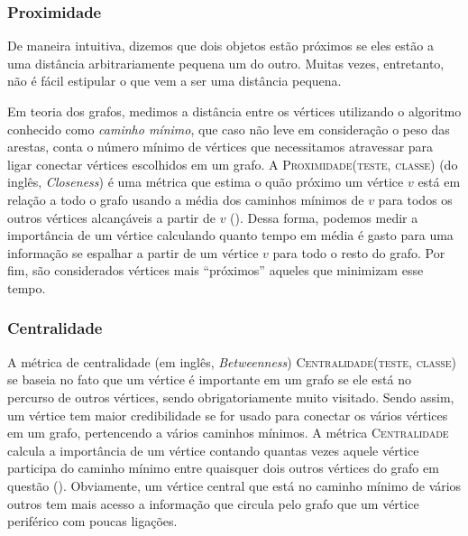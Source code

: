 \subsubsection{Proximidade}
\label{subsubsection::closeness}

De maneira intuitiva, dizemos que dois objetos estão próximos se eles estão a uma distância arbitrariamente pequena um do outro. Muitas vezes, entretanto, não é fácil estipular o que vem a ser uma distância pequena. 

Em teoria dos grafos, medimos a distância entre os vértices utilizando o algoritmo conhecido como \textit{caminho mínimo}, que caso não leve em consideração o peso das arestas, conta o número mínimo de vértices que necessitamos atravessar para ligar conectar vértices escolhidos em um grafo. A \textsc{Proximidade(teste, classe)} (do inglês, \textit{Closeness}) é uma métrica que estima o quão próximo um vértice $v$ está em relação a todo o grafo usando a média dos caminhos mínimos de $v$ para todos os outros vértices alcançáveis a partir de $v$ (\cite{Beauchamp65}). Dessa forma, podemos medir a importância de um vértice calculando quanto tempo em média é gasto para uma informação se espalhar a partir de um vértice $v$ para todo o resto do grafo. Por fim, são considerados vértices mais ``próximos'' aqueles que minimizam esse tempo.

\subsubsection{Centralidade}
\label{subsubsection::constraint}
A métrica de centralidade (em inglês, \textit{Betweenness}) \textsc{Centralidade(teste, classe)} se baseia no fato que um vértice é importante em um grafo se ele está no percurso de outros vértices, sendo obrigatoriamente muito visitado. Sendo assim, um vértice tem maior credibilidade se for usado para conectar os vários vértices em um grafo, pertencendo a vários caminhos mínimos.
A métrica \textsc{Centralidade} calcula a importância de um vértice contando quantas vezes aquele vértice participa do caminho mínimo entre quaisquer dois outros vértices do grafo em questão (\cite{Sabidussi66}). Obviamente, um vértice central que está no caminho mínimo de vários outros tem mais acesso a informação que circula pelo grafo que um vértice periférico com poucas ligações.

